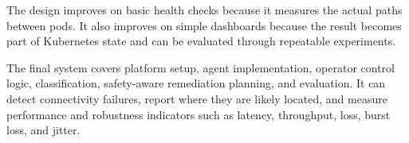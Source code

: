 \documentclass[11pt,a4paper]{article}
\begin{document}
The design improves on basic health checks because it measures the actual paths between pods. It also improves on simple dashboards because the result becomes part of Kubernetes state and can be evaluated through repeatable experiments.

The final system covers platform setup, agent implementation, operator control logic, classification, safety-aware remediation planning, and evaluation. It can detect connectivity failures, report where they are likely located, and measure performance and robustness indicators such as latency, throughput, loss, burst loss, and jitter.
\end{document}
